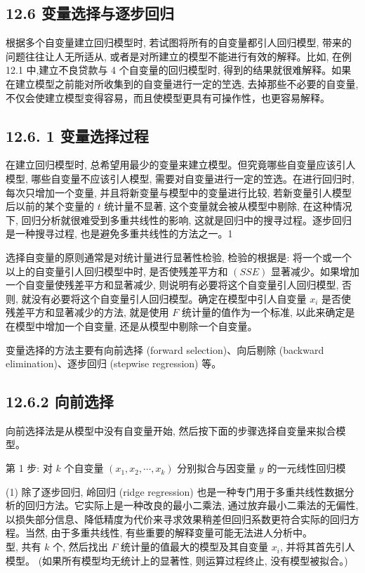 \documentclass[10pt]{article}
\begin{document}
\begin{CJK*}{UTF8}{bsmi}
\section*{12.6 变量选择与逐步回归}
根据多个自变量建立回归模型时, 若试图将所有的自变量都引人回归模型, 带来的问题往往让人无所适从, 或者是对所建立的模型不能进行有效的解释。比如, 在例 12.1 中,建立不良贷款与 4 个自变量的回归模型时, 得到的结果就很难解释。如果在建立模型之前能对所收集到的自变量进行一定的笁选, 去掉那些不必要的自变量, 不仅会使建立模型变得容易，而且使模型更具有可操作性，也更容易解释。

\subsection*{12.6. 1 变量选择过程}
在建立回归模型时, 总希望用最少的变量来建立模型。但究竟哪些自变量应该引人模型, 哪些自变量不应该引人模型, 需要对自变量进行一定的笠选。在进行回归时, 每次只增加一个变量, 并且将新变量与模型中的变量进行比较, 若新变量引人模型后以前的某个变量的 $t$ 统计量不显著, 这个变量就会被从模型中剔除, 在这种情况下, 回归分析就很难受到多重共线性的影响, 这就是回归中的搜寻过程。逐步回归是一种搜寻过程, 也是避免多重共线性的方法之一。1

选择自变量的原则通常是对统计量进行显著性检验, 检验的根据是: 将一个或一个以上的自变量引人回归模型中时, 是否使残差平方和 $(S S E)$ 显著减少。如果增加一个自变量使残差平方和显著减少, 则说明有必要将这个自变量引人回归模型, 否则, 就没有必要将这个自变量引人回归模型。确定在模型中引人自变量 $x_{i}$ 是否使残差平方和显著减少的方法, 就是使用 $F$ 统计量的值作为一个标准, 以此来确定是在模型中增加一个自变量, 还是从模型中剔除一个自变量。

变量选择的方法主要有向前选择 (forward selection)、向后剔除 (backward elimination)、逐步回归 (stepwise regression) 等。

\subsection*{12.6.2 向前选择}
向前选择法是从模型中没有自变量开始, 然后按下面的步骤选择自变量来拟合模型。

第 1 步: 对 $k$ 个自变量 $\left(x_{1}, x_{2}, \cdots, x_{k}\right)$ 分别拟合与因变量 $y$ 的一元线性回归模

(1) 除了逐步回归, 岭回归 (ridge regression) 也是一种专门用于多重共线性数据分析的回归方法。它实际上是一种改良的最小二乘法, 通过放弃最小二乘法的无偏性, 以损失部分信息、降低精度为代价来寻求效果稍差但回归系数更符合实际的回归方程。当然, 由于多重共线性, 有些重要的解释变量可能无法进人分析中。\\
型, 共有 $k$ 个, 然后找出 $F$ 统计量的值最大的模型及其自变量 $x_{i}$, 并将其首先引人模型。 (如果所有模型均无统计上的显著性, 则运算过程终止, 没有模型被拟合。)


\end{CJK*}
\end{document}
